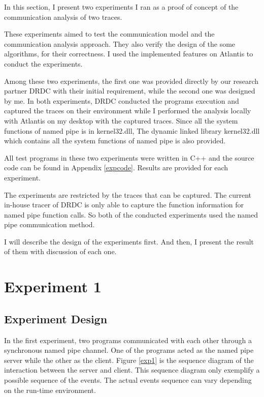


\label{chapter:Exp}
In this section, I present two experiments I ran as a proof of concept of the communication analysis of two traces.

These experiments aimed to test the communication model and the communication analysis approach. They also verify the design of the some algorithms, for their correctness. I used the implemented features on Atlantis to conduct the experiments.

Among these two experiments, the first one was provided directly by our research partner DRDC with their initial requirement, while the second one was designed by me. In both experiments, DRDC conducted the programs execution and captured the traces on their environment while I performed the analysis locally with Atlantis on my desktop with the captured traces. Since all the system functions of named pipe is in kernel32.dll, The dynamic linked library kernel32.dll which contains all the system functions of named pipe is also provided.

All test programs in these two experiments were written in C++ and the source code can be found in Appendix \ref{expcode}. Results are provided for each experiment. 

The experiments are restricted by the traces that can
be captured.  The current in-house tracer of DRDC is only able to capture the function information for named pipe function calls. So both of the conducted experiments used the named pipe communication method. 

I will describe the design of the experiments first. And then, I present the result of them with discussion of each one.

\section{Experiment 1}
\subsection{Experiment Design}
In the first experiment, two programs communicated with each other through a synchronous named pipe channel. One of the programs acted as the named pipe server while the other as the client. Figure \ref{exp1} is the sequence diagram of the interaction between the server and client. This sequence diagram only exemplify a possible sequence of the events. The actual events sequence can vary depending on the run-time environment. 


